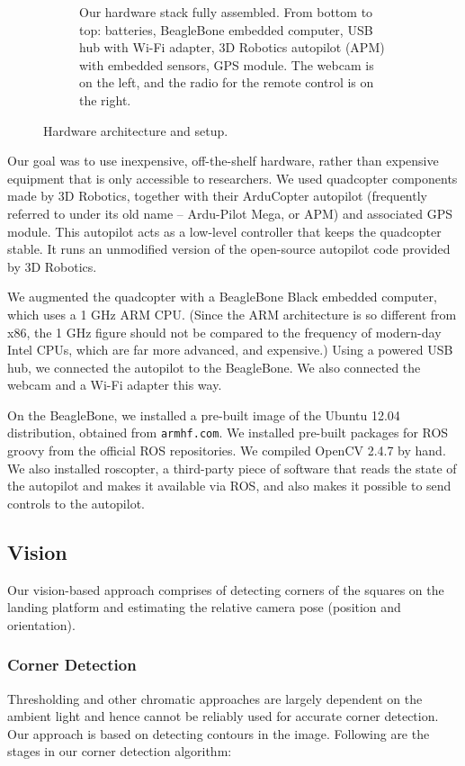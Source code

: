 \documentclass[10pt]{scrartcl} %
\begin{document}
\begin{figure}[h!]
\begin{subfigure}[b]{0.9\textwidth}
        \caption{
            Our hardware stack fully assembled. From bottom to top: batteries,
            BeagleBone embedded computer, USB hub with Wi-Fi adapter, 3D
            Robotics autopilot (APM) with embedded sensors, GPS module. The
            webcam is on the left, and the radio for the remote control is on
            the right.
        }
    \end{subfigure}
    \caption{Hardware architecture and setup.}
    \label{fig:hardware}
\end{figure}

Our goal was to use inexpensive, off-the-shelf hardware, rather than expensive
equipment that is only accessible to researchers. We used quadcopter components
made by 3D Robotics, together with their ArduCopter autopilot (frequently
referred to under its old name -- Ardu-Pilot Mega, or APM) and associated GPS
module. This autopilot acts as a low-level controller that keeps the quadcopter
stable. It runs an unmodified version of the open-source autopilot code
provided by 3D Robotics.

We augmented the quadcopter with a BeagleBone Black embedded computer, which
uses a 1 GHz ARM CPU. (Since the ARM architecture is so different from x86,
the 1 GHz figure should not be compared to the frequency of modern-day Intel
CPUs, which are far more advanced, and expensive.) Using a powered USB hub, we
connected the autopilot to the BeagleBone. We also connected the webcam and a
Wi-Fi adapter this way.


On the BeagleBone, we installed a pre-built image of the Ubuntu 12.04
distribution, obtained from {\tt armhf.com}. We installed pre-built packages
for ROS groovy from the official ROS repositories. We compiled OpenCV 2.4.7 by
hand. We also installed roscopter, a third-party piece of software that reads
the state of the autopilot and makes it available via ROS, and also makes it
possible to send controls to the autopilot.


\subsection{Vision}
Our vision-based approach comprises of detecting corners of the squares on the 
landing platform and estimating the relative camera pose (position and orientation).

\subsubsection{Corner Detection}
Thresholding and other chromatic approaches are largely dependent on the ambient light
and hence cannot be reliably used for accurate corner detection. Our approach is based
on detecting contours in the image. Following are the stages in our corner detection 
algorithm:
\end{document}
